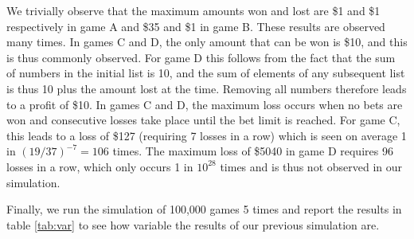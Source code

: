 \documentclass[12pt]{article}\usepackage[]{graphicx}\usepackage[]{color}
\begin{document}
We trivially observe that the maximum amounts won and lost are \$1 and \$1 respectively in game A and \$35 and \$1 in game B. These results are observed many times. In games C and D, the only amount that can be won is \$10, and this is thus commonly observed. For game D this follows from the fact that the sum of numbers in the initial list is 10, and the sum of elements of any subsequent list is thus 10 plus the amount lost at the time. Removing all numbers therefore leads to a profit of \$10. In games C and D, the maximum loss occurs when no bets are won and consecutive losses take place until the bet limit is reached. For game C, this leads to a loss of \$127 (requiring 7 losses in a row) which is seen on average 1 in $(19/37)^{-7} = 106$ times. The maximum loss of \$5040 in game D requires 96 losses in a row, which only occurs 1 in $10^{28}$ times and is thus not observed in our simulation.

Finally, we run the simulation of 100,000 games 5 times and report the results in table \ref{tab:var} to see how variable the results of our previous simulation are.
\end{document}
